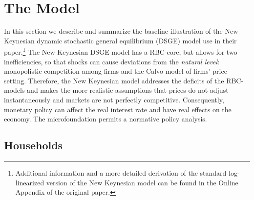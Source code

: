 \section{The Model}
In this section we describe and summarize the baseline illustration of the New Keynesian dynamic stochastic general equilibrium (DSGE) model \citet{Erceg.2014} use in their paper.\footnote{Additional information and a more detailed derivation of the standard log-linearized version of the New Keynesian model can be found in the Online Appendix of the original paper.} The New Keynesian DSGE model has a RBC-core, but allows for two inefficiencies, so that shocks can cause deviations from the \textit{natural level}: monopolistic competition among firms and the Calvo model of firms' price setting. Therefore, the New Keynesian model addresses the deficits of the RBC-models and makes the more realistic assumptions that prices do not adjust instantaneously and markets are not perfectly competitive. Consequently, monetary policy can affect the real interest rate and have real effects on the economy. The microfoundation permits a normative policy analysis.
\subsection*{Households}

